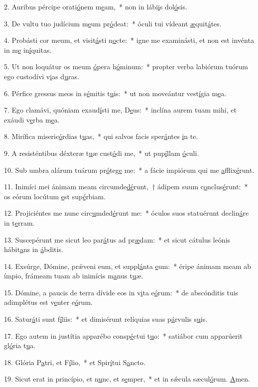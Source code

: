 2. Auribus pércipe orati\uline{ó}nem m\uline{e}am,~* non in lábi\uline{i}s dol\uline{ó}sis.\par 
3. De vultu tuo judícium m\uline{e}um pr\uline{ó}deat:~* óculi tui vídeant \uline{æ}quit\uline{á}tes.\par 
4. Probásti cor meum, et visit\uline{á}sti n\uline{o}cte:~* igne me examinásti, et non est invénta in m\uline{e} in\uline{í}quitas.\par 
5. Ut non loquátur os meum \uline{ó}pera h\uline{ó}minum:~* propter verba labiórum tuórum ego custodívi v\uline{i}as d\uline{u}ras.\par 
6. Pérfice gressus meos in s\uline{é}mitis t\uline{u}is:~* ut non moveántur vest\uline{í}gia m\uline{e}a.\par 
7. Ego clamávi, quóniam exaud\uline{í}sti me, D\uline{e}us:~* inclína aurem tuam mihi, et exáudi v\uline{e}rba m\uline{e}a.\par 
8. Mirífica miseric\uline{ó}rdias t\uline{u}as,~* qui salvos facis sper\uline{á}ntes \uline{i}n te.\par 
9. A resisténtibus déxteræ t\uline{u}æ cust\uline{ó}di me,~* ut pup\uline{í}llam \uline{ó}culi.\par 
10. Sub umbra alárum tuárum pr\uline{ó}teg\uline{e} me:~* a fácie impiórum qui me \uline{a}fflix\uline{é}runt.\par 
11. Inimíci mei ánimam meam circumde\uline{dé}runt,~† ádipem suum c\uline{o}nclus\uline{é}runt:~* os eórum locútum \uline{e}st sup\uline{é}rbiam.\par 
12. Projiciéntes me nunc circ\uline{u}mded\uline{é}runt me:~* óculos suos statuérunt declin\uline{á}re in t\uline{e}rram.\par 
13. Suscepérunt me sicut leo par\uline{á}tus ad pr\uline{æ}dam:~* et sicut cátulus leónis hábit\uline{a}ns in \uline{á}bditis.\par 
14. Exsúrge, Dómine, prǽveni eum, et suppl\uline{á}nta \uline{e}um:~* éripe ánimam meam ab ímpio, frámeam tuam ab inimícis m\uline{a}nus t\uline{u}æ.\par 
15. Dómine, a paucis de terra dívide eos in v\uline{i}ta e\uline{ó}rum:~* de abscónditis tuis adimplétus est v\uline{e}nter e\uline{ó}rum.\par 
16. Satur\uline{á}ti sunt f\uline{í}liis:~* et dimisérunt relíquias suas p\uline{á}rvulis s\uline{u}is.\par 
17. Ego autem in justítia apparébo consp\uline{é}ctui t\uline{u}o:~* satiábor cum apparúerit gl\uline{ó}ria t\uline{u}a.\par 
18. Glória P\uline{a}tri, et F\uline{í}lio,~* et Spir\uline{í}tui S\uline{a}ncto.\par 
19. Sicut erat in princípio, et n\uline{u}nc, et s\uline{e}mper,~* et in sǽcula sæcul\uline{ó}rum. \uline{A}men.\par 
